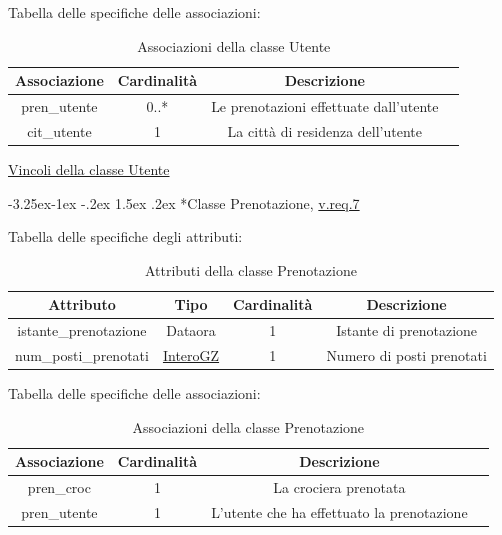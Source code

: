 \documentclass{article}
\makeatletter
\renewcommand\subsection{\@startsection{subsection}{2}{\z@}%
                                     {-3.25ex\@plus -1ex \@minus -.2ex}%
                                     {1.5ex \@plus .2ex}%
                                     {\normalfont\normalsize\bfseries}}
\makeatother
\begin{document}
Tabella delle specifiche delle associazioni:
\begin{table}[h!]
    \centering
    \begin{tabular}{|c|c|c|c|}
        \hline
        Associazione & Cardinalità & Descrizione \\
        \hline
        pren\_utente & 0..* & Le prenotazioni effettuate dall'utente \\
        cit\_utente & 1 & La città di residenza dell'utente \\
        \hline
    \end{tabular}
    \caption{Associazioni della classe Utente}
\end{table}

\hyperref[sec:VincoliUtente]{Vincoli della classe Utente}

\subsection*{Classe Prenotazione, \hyperref[sec:RequisitiPrenotazione]{v.req.7}}\label{sec:Prenotazione}

Tabella delle specifiche degli attributi:
\begin{table}[h!]
    \centering
    \begin{tabular}{|c|c|c|c|}
        \hline
        Attributo & Tipo & Cardinalità & Descrizione \\
        \hline
        istante\_prenotazione & Dataora & 1 & Istante di prenotazione \\
        num\_posti\_prenotati & \hyperref[sec:InteroGZ]{InteroGZ} & 1 & Numero di posti prenotati \\
        \hline
    \end{tabular}
    \caption{Attributi della classe Prenotazione}
\end{table}

Tabella delle specifiche delle associazioni:
\begin{table}[h!]
    \centering
    \begin{tabular}{|c|c|c|c|}
        \hline
        Associazione & Cardinalità & Descrizione \\
        \hline
        pren\_croc & 1 & La crociera prenotata \\
        pren\_utente & 1 & L'utente che ha effettuato la prenotazione \\
        \hline
    \end{tabular}
    \caption{Associazioni della classe Prenotazione}
\end{table}
\end{document}
